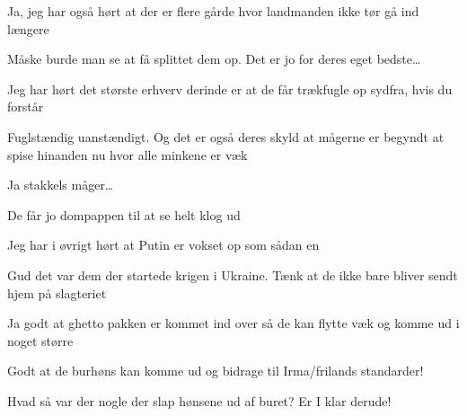 \documentclass[a4paper,11pt]{article}
\begin{document}
\begin{sketch}
 Ja, jeg har også hørt at der er flere gårde hvor landmanden ikke tør gå ind længere

 Måske burde man se at få splittet dem op. Det er jo for deres eget bedste…

 Jeg har hørt det største erhverv derinde er at de får trækfugle op sydfra, hvis du forstår

 Fuglstændig uanstændigt. Og det er også deres skyld at mågerne er begyndt at spise hinanden nu hvor alle minkene er væk

 Ja stakkels måger…

 De får jo dompappen til at se helt klog ud

 Jeg har i øvrigt hørt at Putin er vokset op som sådan en

 Gud det var dem der startede krigen i Ukraine. Tænk at de ikke bare bliver sendt hjem på slagteriet
 
 Ja godt at ghetto pakken er kommet ind over så de kan flytte væk og komme ud i noget større

 Godt at de burhøns kan komme ud og bidrage til Irma/frilands standarder!


 Hvad så var der nogle der slap hønsene ud af buret? Er I klar derude!



\end{sketch}
\end{document}
